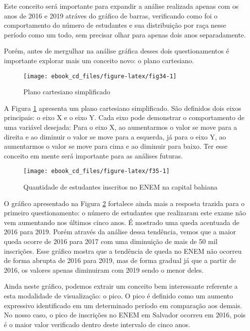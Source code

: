 \documentclass[
  oneside]{book}
\begin{document}
Este conceito será importante para expandir a análise realizada apenas com os anos de 2016 e 2019 atráves do gráfico de barras, verificando como foi o comportamento do número de estudantes e sua distribuição por raça nesse período como um todo, sem precisar olhar para apenas dois anos separadamente.

Porém, antes de mergulhar na análise gráfica desses dois questionamentos é importante explorar mais um conceito novo: o plano cartesiano.

\begin{figure}

{\centering \texttt{[image: ebook\_cd\_files/figure-latex/fig34-1]} 

}

\caption{Plano cartesiano simplificado}\label{fig:fig34}
\end{figure}

A Figura \ref{fig:fig34} apresenta um plano cartesiano simplificado. São definidos dois eixos principais: o eixo X e o eixo Y. Cada eixo pode demonstrar o comportamento de uma variável desejada: Para o eixo X, ao aumentarmos o valor se move para a direita e ao diminuir o valor se move para a esquerda, já para o eixo Y, ao aumentarmos o valor se move para cima e ao diminuir para baixo. Ter esse conceito em mente será importante para as análises futuras.

\begin{figure}

{\centering \texttt{[image: ebook\_cd\_files/figure-latex/f35-1]} 

}

\caption{Quantidade de estudantes inscritos no ENEM na capital bahiana}\label{fig:f35}
\end{figure}

O gráfico apresentado na Figura \ref{fig:f35} fortalece ainda mais a resposta trazida para o primeiro questionamento: o número de estudantes que realizaram este exame não vem aumentando nos últimos cinco anos. É mostrado uma queda acentuada de 2016 para 2019. Porém através da análise dessa tendência, vemos que a maior queda ocorre de 2016 para 2017 com uma diminuição de mais de 50 mil inscrições. Esse gráfico mostra que a tendência de queda no ENEM não ocorreu de forma abrupta de 2016 para 2019, mas de forma gradual já que a partir de 2016, os valores apenas diminuiram com 2019 sendo o menor deles.

Ainda neste gráfico, podemos extrair um conceito bem interessante referente a esta modalidade de visualização: o pico. O pico é definido como um aumento expressivo identificado em um determinado período em comparação aos demais. No nosso caso, o pico de inscrições no ENEM em Salvador ocorreu em 2016, pois é o maior valor verificado dentro deste intervalo de cinco anos.
\end{document}
